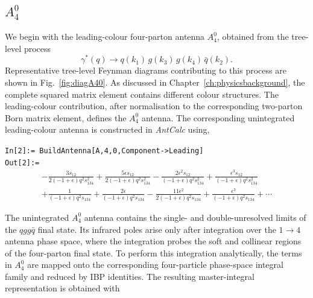 



\subsection{$A_4^0$}\label{subsec:A40}

We begin with the leading-colour four-parton antenna $A_4^0$, obtained from the tree-level
process
\begin{equation*}
    \gamma^*(q)\rightarrow q(k_1)\,g(k_3)\,g(k_4)\,\bar q(k_2).
\end{equation*}
Representative tree-level Feynman diagrams contributing to this process are shown in Fig.~\ref{fig:diagA40}.
As discussed in Chapter~\ref{ch:physicsbackground}, the complete squared matrix element
contains different colour structures. The leading-colour contribution, after normalisation to
the corresponding two-parton Born matrix element, defines the $A_4^0$ antenna. The
corresponding unintegrated leading-colour antenna is constructed in \textit{AntCalc} using,

\begin{mdframed}[backgroundcolor=gray!10, linewidth=0pt]
\texttt{In[2]:= BuildAntenna[A,4,0,Component->Leading]}\\
\hfill
\texttt{Out[2]:=}
    \begin{equation*}
        \begin{gathered}
            -\frac{3s_{12}}{2(-1+\epsilon)q^2s_{134}^2}+\frac{5\epsilon s_{12}}{2(-1+\epsilon)q^2s_{134}^2}-\frac{2\epsilon^2s_{12}}{(-1+\epsilon)q^2s_{134}^2}+\frac{\epsilon^3s_{12}}{(-1+\epsilon)q^2s_{134}^2}\\
            +\frac{1}{(-1+\epsilon)q^2s_{134}}+\frac{2\epsilon}{(-1+\epsilon)q^2s_{134}}-\frac{11\epsilon^2}{2(-1+\epsilon)q^2s_{134}}+\frac{\epsilon^3}{(-1+\epsilon)q^2s_{134}}+\cdots
        \end{gathered}
    \end{equation*}
\end{mdframed}

The unintegrated $A_4^0$ antenna contains the single- and double-unresolved limits of the
$qgg\bar q$ final state. Its infrared poles arise only after integration over the $1\to4$ antenna phase space,
where the integration probes the soft and collinear regions of the four-parton final state. To
perform this integration analytically, the terms in $A_4^0$ are mapped onto the corresponding
four-particle phase-space integral family and reduced by IBP identities. The resulting
master-integral representation is obtained with

